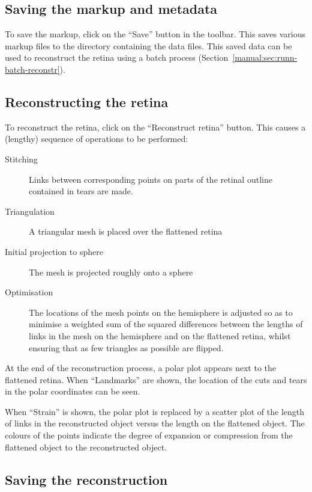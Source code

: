 \documentclass{article}
\begin{document}
\subsection{Saving the markup and metadata}
\label{manual:sec:saving-markup}

To save the markup, click on the ``Save'' button in the toolbar. This
saves various markup files to the directory containing the
data files. This saved data can be used to reconstruct the retina using
a batch process (Section~\ref{manual:sec:runn-batch-reconstr}).

\subsection{Reconstructing the retina}
\label{manual:sec:reconstr-retina}

To reconstruct the retina, click on the ``Reconstruct retina''
button. This causes a (lengthy) sequence of operations to be performed:
\begin{description}
\item[Stitching] Links between corresponding points on parts of the retinal
  outline  contained in tears are made.
\item[Triangulation] A triangular mesh is placed over the flattened retina
\item[Initial projection to sphere ] The mesh is projected roughly
  onto a sphere
\item[Optimisation] The locations of the mesh points on the hemisphere
  is adjusted so as to minimise a weighted sum of the squared
  differences between the lengths of links in the mesh on the
  hemisphere and on the flattened retina, whilst ensuring that as few
  triangles as possible are flipped.
\end{description}

At the end of the reconstruction process, a polar plot appears next to
the flattened retina. When ``Landmarks'' are shown, the location of
the cuts and tears in the polar coordinates can be seen.

When ``Strain'' is shown, the polar plot is replaced by a scatter plot of the
length of links in the reconstructed object versus the length on the
flattened object. The colours of the points indicate the degree of
expansion or compression from the flattened object to the
reconstructed object.

\subsection{Saving the reconstruction}
\label{manual:sec:saving-reconstr}
\end{document}
